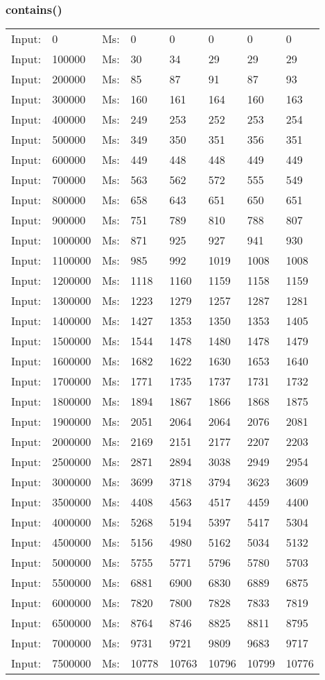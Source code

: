 \documentclass[11pt,a4paper]{report}
\begin{document}
\begin{tiny}
\subsubsection*{contains()}
\begin{tabular}{l l ||l  l  l  l  l  l}
Input:&0&Ms:&0&0&0&0&0\\
Input:&100000&Ms:&30&34&29&29&29\\
Input:&200000&Ms:&85&87&91&87&93\\
Input:&300000&Ms:&160&161&164&160&163\\
Input:&400000&Ms:&249&253&252&253&254\\
Input:&500000&Ms:&349&350&351&356&351\\
Input:&600000&Ms:&449&448&448&449&449\\
Input:&700000&Ms:&563&562&572&555&549\\
Input:&800000&Ms:&658&643&651&650&651\\
Input:&900000&Ms:&751&789&810&788&807\\
Input:&1000000&Ms:&871&925&927&941&930\\
Input:&1100000&Ms:&985&992&1019&1008&1008\\
Input:&1200000&Ms:&1118&1160&1159&1158&1159\\
Input:&1300000&Ms:&1223&1279&1257&1287&1281\\
Input:&1400000&Ms:&1427&1353&1350&1353&1405\\
Input:&1500000&Ms:&1544&1478&1480&1478&1479\\
Input:&1600000&Ms:&1682&1622&1630&1653&1640\\
Input:&1700000&Ms:&1771&1735&1737&1731&1732\\
Input:&1800000&Ms:&1894&1867&1866&1868&1875\\
Input:&1900000&Ms:&2051&2064&2064&2076&2081\\
Input:&2000000&Ms:&2169&2151&2177&2207&2203\\
Input:&2500000&Ms:&2871&2894&3038&2949&2954\\
Input:&3000000&Ms:&3699&3718&3794&3623&3609\\
Input:&3500000&Ms:&4408&4563&4517&4459&4400\\
Input:&4000000&Ms:&5268&5194&5397&5417&5304\\
Input:&4500000&Ms:&5156&4980&5162&5034&5132\\
Input:&5000000&Ms:&5755&5771&5796&5780&5703\\
Input:&5500000&Ms:&6881&6900&6830&6889&6875\\
Input:&6000000&Ms:&7820&7800&7828&7833&7819\\
Input:&6500000&Ms:&8764&8746&8825&8811&8795\\
Input:&7000000&Ms:&9731&9721&9809&9683&9717\\
Input:&7500000&Ms:&10778&10763&10796&10799&10776\\
\end{tabular}


\end{tiny}
\end{document}
